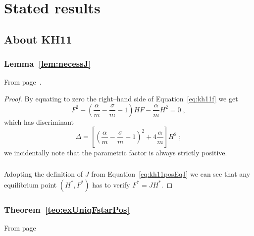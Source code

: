 \chapter{Stated results}

\section{About KH11}
\subsection{ Lemma~\ref{lem:necessJ} }
From page~\pageref{lem:necessJ}.
\begin{proof}
    By equating to zero the right--hand side of Equation~\eqref{eq:kh11f} we get
    $$F^2 - \left( \frac{\alpha}{m} - \frac{\sigma}{m} -1
        \right) H F - \frac{\alpha}{m} H^2 = 0 \; ,$$
    which has discriminant
    $$\Delta = \left[ {\left( \frac{\alpha}{m} - \frac{\sigma}{m} -1
        \right)}^2 + 4 \frac{\alpha}{m}
        \right] H^2 \; ; $$
    we incidentally note that the parametric factor is always strictly positive.

    \paragraph{}
    Adopting the definition of $J$ from Equation~\eqref{eq:kh11posEqJ} we can see that any equilibrium point $(H^*, F^*)$ has to verify $F^* = J H^*$.
\end{proof}

\subsection{ Theorem~\ref{teo:exUniqFstarPos} }
From page~\pageref{teo:exUniqFstarPos}

